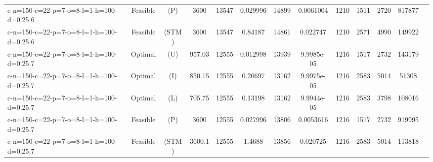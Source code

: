 \documentclass[landscape, a4paper]{article}
\newcommand{\STM}{\ensuremath{\mathrm{STM}}}
\newcommand{\Improved}{\ensuremath{\mathrm{I}}}
\newcommand{\Loose}{\ensuremath{\mathrm{L}}}
\newcommand{\Profit}{\ensuremath{\mathrm{P}}}
\newcommand{\Utility}{\ensuremath{\mathrm{U}}}
\begin{document}
\begin{center}
\begin{tabular}{lcccccccccccc}
c-n=150-c=22-p=7-o=8-l=1-h=100-d=0.25.6 & Feasible & (\Profit) & 3600 & 13547 & 0.029996 & 14899 & 0.0061004 & 1210 & 1511 & 2720 & 817877 & \\
c-n=150-c=22-p=7-o=8-l=1-h=100-d=0.25.6 & Feasible & (\STM) & 3600 & 13547 & 0.84187 & 14861 & 0.022747 & 1210 & 2571 & 4990 & 149922 & \\
c-n=150-c=22-p=7-o=8-l=1-h=100-d=0.25.7 & Optimal & (\Utility) & 957.03 & 12555 & 0.012998 & 13939 & 9.9985e-05 & 1216 & 1517 & 2732 & 143179 & \\
c-n=150-c=22-p=7-o=8-l=1-h=100-d=0.25.7 & Optimal & (\Improved) & 850.15 & 12555 & 0.20697 & 13162 & 9.9975e-05 & 1216 & 2583 & 5014 & 51308 & \\
c-n=150-c=22-p=7-o=8-l=1-h=100-d=0.25.7 & Optimal & (\Loose) & 705.75 & 12555 & 0.13198 & 13162 & 9.9944e-05 & 1216 & 2583 & 3798 & 108016 & \\
c-n=150-c=22-p=7-o=8-l=1-h=100-d=0.25.7 & Feasible & (\Profit) & 3600 & 12555 & 0.027996 & 13806 & 0.0053616 & 1216 & 1517 & 2732 & 919995 & \\
c-n=150-c=22-p=7-o=8-l=1-h=100-d=0.25.7 & Feasible & (\STM) & 3600.1 & 12555 & 1.4688 & 13856 & 0.020725 & 1216 & 2583 & 5014 & 113818 & \\
\end{tabular}
\end{center}
\end{document}
